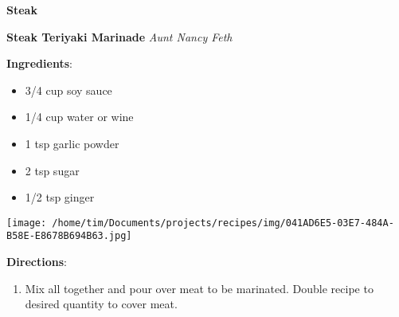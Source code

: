 \documentclass[11pt, twoside, openany]{book}
\begin{document}
{\newpage \LARGE \textbf{Steak}} \label{steak}\\
\noindent\begin{minipage}[t]{\linewidth}%
{\Large\textbf{Steak Teriyaki Marinade}} \label{steak-teriyaki-marinade}\hfill\textit{Aunt Nancy Feth}\\
\noindent\begin{minipage}[t]{0.78\linewidth}%
\textbf{Ingredients}:\vspace{-3mm}
\begin{multicols}{2}
\begin{itemize}\setlength\itemsep{-1mm}
\item 3/4 cup soy sauce
\item 1/4 cup water or wine
\item 1 tsp garlic powder
\item 2 tsp sugar
\item 1/2 tsp ginger
\end{itemize}
\end{multicols}
\end{minipage}
\noindent\begin{minipage}[t]{0.18\linewidth}
\centering \strut\vspace*{-\baselineskip}\newline
\texttt{[image: /home/tim/Documents/projects/recipes/img/041AD6E5-03E7-484A-B58E-E8678B694B63.jpg]}\\
\end{minipage}\vspace{3mm}
\textbf{Directions}:
\vspace{-3mm}\begin{enumerate}\setlength\itemsep{-1mm}
\item Mix all together and pour over meat to be marinated. Double recipe to desired quantity to cover meat.
\end{enumerate}
\end{minipage}\vspace{8mm}
\end{document}
